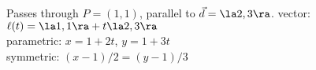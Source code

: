 {Passes through $P=(1,1)$, parallel to $\vec d = \la 2,3\ra$.
}
{vector: $\ell(t) = \la 1,1\ra + t\la 2,3\ra$\\
parametric: $x= 1+2t$, $y=1+3t$\\
symmetric: $(x-1)/2=(y-1)/3$
}

